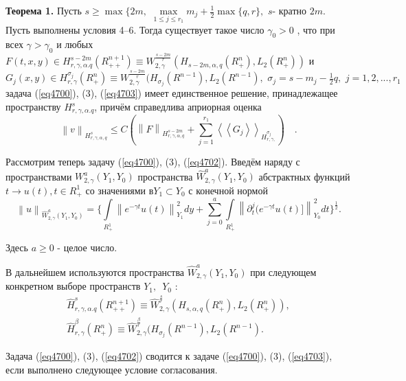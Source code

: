 \textbf{Теорема 1. }
Пусть $s \ge \max \{2m,\,\,\mathop {\max }\limits_{1 \le
j \le r_1 } m_j + \frac{1}{2}\max \{q,r\},\,\,s$- кратно $2m$. Пусть
выполнены условия 4--6. Тогда существует такое число $\gamma _0 > 0$ , что
при всех $\gamma > \gamma _0 $ и любых $F(t,x,y) \in H_{r,\gamma ,\alpha
.q}^{s - 2m} (R_{ + + }^{n + 1} ) \equiv W_{2,\gamma }^{\frac{s - 2m}{r}}
(H_{s - 2m,\alpha ,q} (R_ + ^n ),L_2 (R_ + ^n ))$ и
\linebreak
$G_j (x,y) \in
H_{r,\gamma }^{\sigma _j } (R_ + ^n ) \equiv W_{2,\gamma }^{\frac{s -
2m}{r}} (H_{\sigma _j } (R^{n - 1}),L_2 (R^{n - 1}),\,\,\sigma _j = s - m_j
- \frac{1}{2}q,\,\,j = 1,2,...,r_1 $ задача (\ref{eq4700}), (3), (\ref{eq4703}) имеет единственное
решение, принадлежащее пространству $H_{r,\gamma ,\alpha .q}^s $, причём
справедлива априорная оценка
\[
\left\| v \right\|_{H_{r,\gamma ,\alpha ,q}^s } \le C(\left\| F
\right\|_{H_{r,\gamma ,\alpha ,q}^{s - 2m} } + \sum\limits_{j = 1}^{r_1 }
{\left\langle {\left\langle {G_j } \right\rangle } \right\rangle }
_{H_{r,\gamma ,}^{\sigma _j } } ) \quad .
\]






Рассмотрим теперь задачу (\ref{eq4700}), (3), (\ref{eq4702}). Введём наряду с пространствами
$W_{2,\gamma }^a (Y_1 ,Y_0 )$ пространства $\hat {W}_{2,\gamma }^a (Y_1 ,Y_0
)$ абстрактных функций $t \to u(t),t \in R_ + ^1 $ со значениями в$Y_1
\subset Y_0 $ с конечной нормой
\[
\left\| u \right\|_{\hat {W}_{2,\gamma }^a (Y_1 ,Y_0 )} = \{\int\limits_{R_
+ ^1 } {\left\| {e^{ - \gamma t}u(t)} \right\|_{Y_1 }^2 dy} + \sum\limits_{j
= 0}^a {\int\limits_{R_ + ^1 } {\left\| {\partial _t^j (e^{ - \gamma
t}u(t)]} \right\|_{Y_0 }^2 dt\}^{\frac{1}{2}}} } .
\]

Здесь $a \ge 0$ - целое число.

В дальнейшем используются пространства $\hat {W}_{2,\gamma }^a (Y_1 ,Y_0 )$
при следующем конкретном выборе пространств $Y_1 ,\,\,\,Y_0 $ :
\begin{gather*}
\hat {H}_{r,\gamma ,\alpha .q}^s (R_{ + + }^{n + 1} ) \equiv \hat
{W}_{2,\gamma }^{\frac{s}{r}} (H_{s,\alpha ,q} (R_ + ^n ),L_2 (R_ + ^n )),
\\
\hat {H}_{r,\gamma }^\beta (R_ + ^n ) \equiv \hat {W}_{2,\gamma
}^{\frac{\beta }{r}} (H_{\sigma _j } (R^{n - 1}),L_2 (R^{n - 1}).
\end{gather*}



Задача (\ref{eq4700}), (3), (\ref{eq4702}) сводится к задаче (\ref{eq4700}), (3), (\ref{eq4703}), если выполнено
следующее условие согласования.


